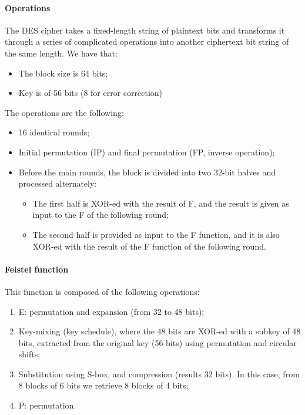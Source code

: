 \paragraph{Operations}

The DES cipher takes a fixed-length string of plaintext bits and transforms it through a series of complicated operations into another ciphertext bit string of the same length. We have that:

\begin{itemize}
    \item The block size is 64 bits;
    \item Key is of 56 bits (8 for error correction)
\end{itemize}

The operations are the following:

\begin{itemize}
    \item 16 identical rounds;
    \item Initial permutation (IP) and final permutation (FP, inverse operation);
    \item Before the main rounds, the block is divided into two 32-bit halves and processed alternately:

    \begin{itemize}
        \item The first half is XOR-ed with the result of F, and the result is given as input to the F of the following round;
        \item The second half is provided as input to the F function, and it is also XOR-ed with the result of the F function of the following round.
    \end{itemize}
\end{itemize}


\paragraph{Feistel function}

This function is composed of the following operations:

\begin{enumerate}
    \item E: permutation and expansion (from 32 to 48 bits);
    \item Key-mixing (key schedule), where the 48 bits are XOR-ed with a subkey of 48 bits, extracted from the original key (56 bits) using permutation and circular shifts;
    \item Substitution using S-box, and compression (results 32 bits). In this case, from 8 blocks of 6 bits we retrieve 8 blocks of 4 bits;
    \item P: permutation.
\end{enumerate}

